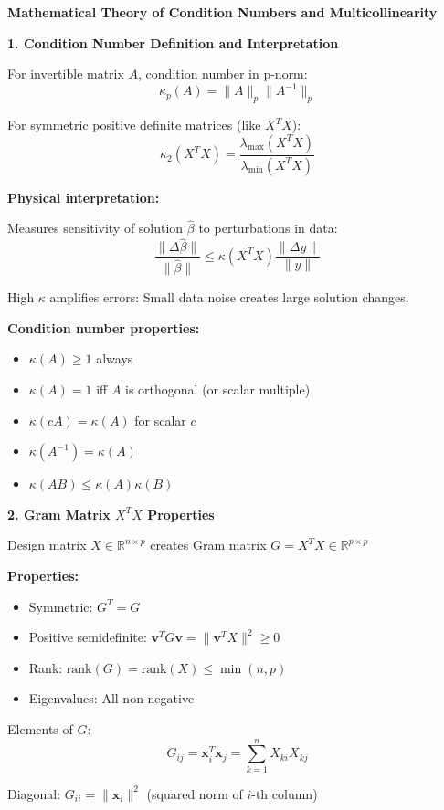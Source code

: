 \documentclass[12pt]{article}
\begin{document}
\begin{explanation}

\textbf{Mathematical Theory of Condition Numbers and Multicollinearity}

\textbf{1. Condition Number Definition and Interpretation}

For invertible matrix $A$, condition number in p-norm:
\[\kappa_p(A) = \|A\|_p \|A^{-1}\|_p\]

For symmetric positive definite matrices (like $X^TX$):
\[\kappa_2(X^TX) = \frac{\lambda_{\max}(X^TX)}{\lambda_{\min}(X^TX)}\]

\textbf{Physical interpretation:}

Measures sensitivity of solution $\hat{\beta}$ to perturbations in data:
\[\frac{\|\Delta \hat{\beta}\|}{\|\hat{\beta}\|} \leq \kappa(X^TX) \frac{\|\Delta y\|}{\|y\|}\]

High $\kappa$ amplifies errors: Small data noise creates large solution changes.

\textbf{Condition number properties:}
\begin{itemize}
\item $\kappa(A) \geq 1$ always
\item $\kappa(A) = 1$ iff $A$ is orthogonal (or scalar multiple)
\item $\kappa(cA) = \kappa(A)$ for scalar $c$
\item $\kappa(A^{-1}) = \kappa(A)$
\item $\kappa(AB) \leq \kappa(A)\kappa(B)$
\end{itemize}

\textbf{2. Gram Matrix $X^TX$ Properties}

Design matrix $X \in \mathbb{R}^{n \times p}$ creates Gram matrix $G = X^TX \in \mathbb{R}^{p \times p}$

\textbf{Properties:}
\begin{itemize}
\item Symmetric: $G^T = G$
\item Positive semidefinite: $\mathbf{v}^T G \mathbf{v} = \|\mathbf{v}^TX\|^2 \geq 0$
\item Rank: $\text{rank}(G) = \text{rank}(X) \leq \min(n,p)$
\item Eigenvalues: All non-negative
\end{itemize}

Elements of $G$:
\[G_{ij} = \mathbf{x}_i^T \mathbf{x}_j = \sum_{k=1}^{n} X_{ki}X_{kj}\]

Diagonal: $G_{ii} = \|\mathbf{x}_i\|^2$ (squared norm of $i$-th column)


\end{explanation}
\end{document}
